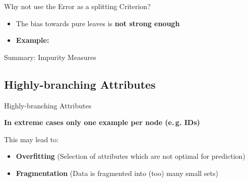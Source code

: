 \begin{frame}{Why not use the Error as a splitting Criterion?}{}\optional
	\begin{itemize}
		\item The bias towards pure leaves is \textbf{not strong enough}
		\item \textbf{Example:}
	\end{itemize}
	
\end{frame}


\begin{frame}{Summary: Impurity Measures}{}
	
\end{frame}


\subsection{Highly-branching Attributes}

\begin{frame}{Highly-branching Attributes}{}
	\begin{boxBlueNoFrame}

		\vspace*{4mm}
		\textbf{In extreme cases only one example per node (e.\,g. IDs)}
	\end{boxBlueNoFrame}

	\begin{boxBlueNoFrame}
		This may lead to:
		\begin{itemize}
			\item \textbf{Overfitting} \footnotesize (Selection of attributes which are not optimal for prediction) \normalsize
			\item \textbf{Fragmentation} \footnotesize (Data is fragmented into (too) many small sets) \normalsize
		\end{itemize}
	\end{boxBlueNoFrame}
\end{frame}


